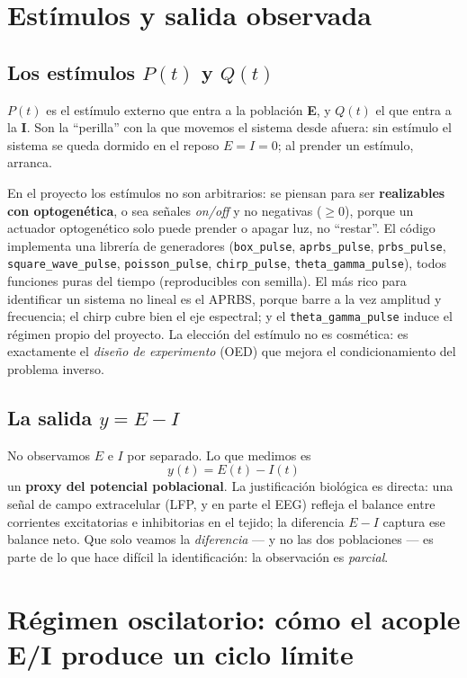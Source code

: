\documentclass[11pt,a4paper]{article}
\begin{document}
\section{Estímulos y salida observada}

\subsection{Los estímulos $P(t)$ y $Q(t)$}
$P(t)$ es el estímulo externo que entra a la población \textbf{E}, y $Q(t)$ el que entra a la \textbf{I}. Son la ``perilla'' con la que movemos el sistema desde afuera: sin estímulo el sistema se queda dormido en el reposo $E=I=0$; al prender un estímulo, arranca.

En el proyecto los estímulos no son arbitrarios: se piensan para ser \textbf{realizables con optogenética}, o sea señales \emph{on/off} y no negativas ($\geq 0$), porque un actuador optogenético solo puede prender o apagar luz, no ``restar''. El código implementa una librería de generadores (\texttt{box\_pulse}, \texttt{aprbs\_pulse}, \texttt{prbs\_pulse}, \texttt{square\_wave\_pulse}, \texttt{poisson\_pulse}, \texttt{chirp\_pulse}, \texttt{theta\_gamma\_pulse}), todos funciones puras del tiempo (reproducibles con semilla). El más rico para identificar un sistema no lineal es el APRBS, porque barre a la vez amplitud y frecuencia; el chirp cubre bien el eje espectral; y el \texttt{theta\_gamma\_pulse} induce el régimen propio del proyecto. La elección del estímulo no es cosmética: es exactamente el \emph{diseño de experimento} (OED) que mejora el condicionamiento del problema inverso.

\subsection{La salida $y=E-I$}
No observamos $E$ e $I$ por separado. Lo que medimos es
\[
\boxed{\,y(t) = E(t) - I(t)\,}
\]
un \textbf{proxy del potencial poblacional}. La justificación biológica es directa: una señal de campo extracelular (LFP, y en parte el EEG) refleja el balance entre corrientes excitatorias e inhibitorias en el tejido; la diferencia $E-I$ captura ese balance neto. Que solo veamos la \emph{diferencia} --- y no las dos poblaciones --- es parte de lo que hace difícil la identificación: la observación es \emph{parcial}.

\section{Régimen oscilatorio: cómo el acople E/I produce un ciclo límite}
\end{document}
